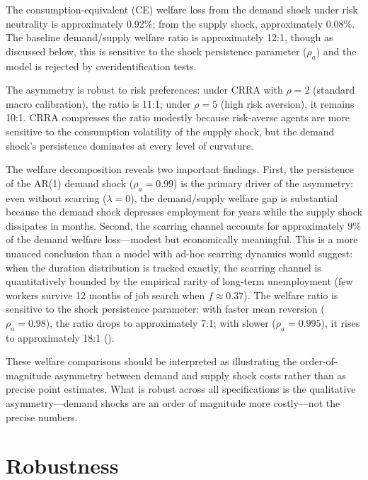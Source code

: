 \documentclass[12pt]{article}
\begin{document}
The consumption-equivalent (CE) welfare loss from the demand shock under risk neutrality is approximately 0.92\%; from the supply shock, approximately 0.08\%. The baseline demand/supply welfare ratio is approximately 12:1, though as discussed below, this is sensitive to the shock persistence parameter ($\rho_a$) and the model is rejected by overidentification tests.



The asymmetry is robust to risk preferences: under CRRA with $\rho = 2$ (standard macro calibration), the ratio is 11:1; under $\rho = 5$ (high risk aversion), it remains 10:1. CRRA compresses the ratio modestly because risk-averse agents are more sensitive to the consumption volatility of the supply shock, but the demand shock's persistence dominates at every level of curvature.

The welfare decomposition reveals two important findings. First, the persistence of the AR(1) demand shock ($\rho_a = 0.99$) is the primary driver of the asymmetry: even without scarring ($\lambda = 0$), the demand/supply welfare gap is substantial because the demand shock depresses employment for years while the supply shock dissipates in months. Second, the scarring channel accounts for approximately 9\% of the demand welfare loss---modest but economically meaningful. This is a more nuanced conclusion than a model with ad-hoc scarring dynamics would suggest: when the duration distribution is tracked exactly, the scarring channel is quantitatively bounded by the empirical rarity of long-term unemployment (few workers survive 12 months of job search when $f \approx 0.37$). The welfare ratio is sensitive to the shock persistence parameter: with faster mean reversion ($\rho_a = 0.98$), the ratio drops to approximately 7:1; with slower ($\rho_a = 0.995$), it rises to approximately 18:1 ().

These welfare comparisons should be interpreted as illustrating the order-of-magnitude asymmetry between demand and supply shock costs rather than as precise point estimates. What is robust across all specifications is the qualitative asymmetry---demand shocks are an order of magnitude more costly---not the precise numbers.


\section{Robustness}
\label{sec:robustness}
\end{document}
